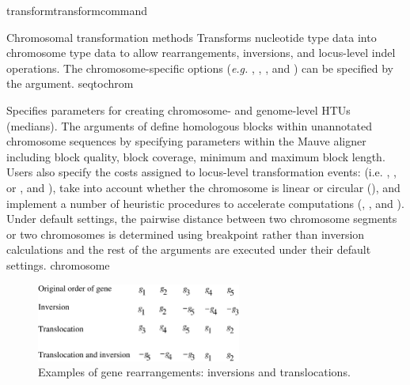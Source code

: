 \begin{command}{transform}{transformcommand}
\begin{arguments}
\begin{argumentgroup}{Chromosomal transformation methods}
           {Transforms nucleotide type data into \\ chromosome type data to allow
            rearrangements, inversions, and locus-level indel operations.  The
            chromosome-specific options (\emph{e.g.}  , 
            , , and ) can be 
            specified by the argument.}
           {seqtochrom}
           
            {Specifies parameters for creating chro\-mosome- and genome-level HTUs (medians).
            The arguments of  define homologous blocks within unannotated chromosome sequences by
             specifying parameters within the Mauve aligner \cite{darlingetal2004} including block quality, block coverage, 	       		   	   
             minimum and maximum block length. Users also specify the costs assigned to locus-level transformation events:
            (i.e. , , or , and
             ), take into account whether the chromosome is linear or circular (), and
             implement a number of 	heuristic procedures to accelerate computations (, , 
             and ).  Under default settings, the pairwise distance between two chromosome segments or two 
             chromosomes is determined using breakpoint rather than inversion calculations and the rest of the arguments are executed 
             under their default settings.}
            {chromosome}

		 \begin{figure} [!htbp]
   		 \begin{center}
        		\includegraphics[width=0.6\textwidth]{doc/figures/genomeRearrangement.pdf}
    		\end{center}
    		 \caption{Examples of gene rearrangements: inversions and translocations.}
		 \label{fig:genomeRearrangement}
		\end{figure}


\end{argumentgroup}
\end{arguments}
\end{command}
